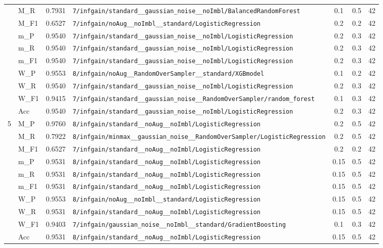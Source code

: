 \begin{table}[htbp]
\begin{tabular}{|c|l|c|>{\ttfamily\footnotesize}p{7.2cm}|c|c|c|}
 & M\_R & 0.7931 & \texttt{7/infgain/standard\_\_gaussian\_noise\_\_noImbl/BalancedRandomForest} & 0.1 & 0.5  & 42 \\ 
 & M\_F1 & 0.6527 & \texttt{7/infgain/noAug\_\_noImbl\_\_standard/LogisticRegression} & 0.2 & 0.2  & 42 \\ 
 & m\_P & 0.9540 & \texttt{7/infgain/standard\_\_gaussian\_noise\_\_noImbl/LogisticRegression} & 0.2 & 0.3  & 42 \\ 
 & m\_R & 0.9540 & \texttt{7/infgain/standard\_\_gaussian\_noise\_\_noImbl/LogisticRegression} & 0.2 & 0.3  & 42 \\ 
 & m\_F1 & 0.9540 & \texttt{7/infgain/standard\_\_gaussian\_noise\_\_noImbl/LogisticRegression} & 0.2 & 0.3  & 42 \\ 
 & W\_P & 0.9553 & \texttt{8/infgain/noAug\_\_RandomOverSampler\_\_standard/XGBmodel} & 0.1 & 0.2  & 42 \\ 
 & W\_R & 0.9540 & \texttt{7/infgain/standard\_\_gaussian\_noise\_\_noImbl/LogisticRegression} & 0.2 & 0.3  & 42 \\ 
 & W\_F1 & 0.9415 & \texttt{7/infgain/standard\_\_gaussian\_noise\_\_RandomOverSampler/random\_forest} & 0.1 & 0.3  & 42 \\ 
 & Acc & 0.9540 & \texttt{7/infgain/standard\_\_gaussian\_noise\_\_noImbl/LogisticRegression} & 0.2 & 0.3  & 42 \\ 
\hline
\multirow{10}{*}{5} & M\_P & 0.9760 & \texttt{8/infgain/standard\_\_noAug\_\_noImbl/LogisticRegression} & 0.2 & 0.5  & 42 \\ 
 & M\_R & 0.7922 & \texttt{8/infgain/minmax\_\_gaussian\_noise\_\_RandomOverSampler/LogisticRegression} & 0.2 & 0.5  & 42 \\ 
 & M\_F1 & 0.6527 & \texttt{7/infgain/standard\_\_noAug\_\_noImbl/LogisticRegression} & 0.2 & 0.2  & 42 \\ 
 & m\_P & 0.9531 & \texttt{8/infgain/standard\_\_noAug\_\_noImbl/LogisticRegression} & 0.15 & 0.5  & 42 \\ 
 & m\_R & 0.9531 & \texttt{8/infgain/standard\_\_noAug\_\_noImbl/LogisticRegression} & 0.15 & 0.5  & 42 \\ 
 & m\_F1 & 0.9531 & \texttt{8/infgain/standard\_\_noAug\_\_noImbl/LogisticRegression} & 0.15 & 0.5  & 42 \\ 
 & W\_P & 0.9553 & \texttt{8/infgain/noAug\_\_noImbl\_\_standard/LogisticRegression} & 0.15 & 0.5  & 42 \\ 
 & W\_R & 0.9531 & \texttt{8/infgain/standard\_\_noAug\_\_noImbl/LogisticRegression} & 0.15 & 0.5  & 42 \\ 
 & W\_F1 & 0.9403 & \texttt{7/infgain/gaussian\_noise\_\_noImbl\_\_standard/GradientBoosting} & 0.1 & 0.3  & 42 \\ 
 & Acc & 0.9531 & \texttt{8/infgain/standard\_\_noAug\_\_noImbl/LogisticRegression} & 0.15 & 0.5  & 42 \\ 
\hline
\end{tabular}
\end{table}
